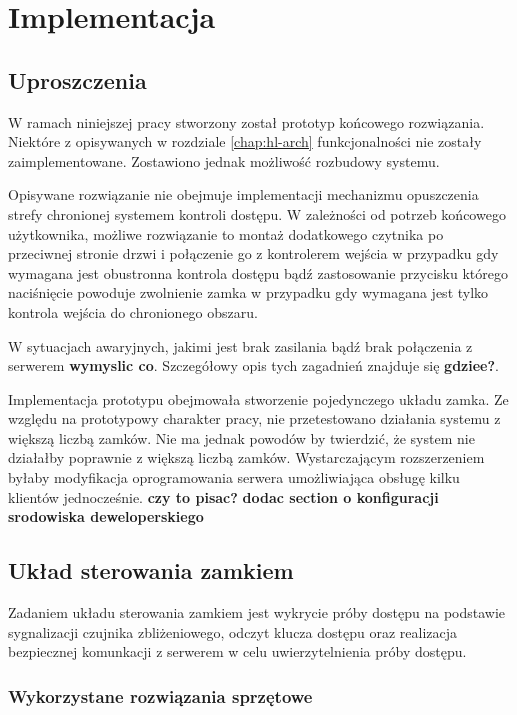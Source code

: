 \chapter{Implementacja}
\label{chap:implementation}

\section{Uproszczenia}

    W ramach niniejszej pracy stworzony został prototyp końcowego rozwiązania. Niektóre z opisywanych w rozdziale \ref{chap:hl-arch} funkcjonalności nie zostały zaimplementowane. Zostawiono jednak możliwość rozbudowy systemu.

    Opisywane rozwiązanie nie obejmuje implementacji mechanizmu opuszczenia strefy chronionej systemem kontroli dostępu. W zależności od potrzeb końcowego użytkownika, możliwe rozwiązanie to montaż dodatkowego czytnika po przeciwnej stronie drzwi i połączenie go z kontrolerem wejścia w przypadku gdy wymagana jest obustronna kontrola dostępu bądź zastosowanie przycisku którego naciśnięcie powoduje zwolnienie zamka w przypadku gdy wymagana jest tylko kontrola wejścia do chronionego obszaru.

    W sytuacjach awaryjnych, jakimi jest brak zasilania bądź brak połączenia z serwerem \textbf{wymyslic co}. Szczegółowy opis tych zagadnień znajduje się \textbf{gdziee?}.

    Implementacja prototypu obejmowała stworzenie pojedynczego układu zamka. Ze względu na prototypowy charakter pracy, nie przetestowano działania systemu z większą liczbą zamków. Nie ma jednak powodów by twierdzić, że system nie działałby poprawnie z większą liczbą zamków. Wystarczającym rozszerzeniem byłaby modyfikacja oprogramowania serwera umożliwiająca obsługę kilku klientów jednocześnie. \textbf{czy to pisac?}
\textbf{dodac section o  konfiguracji srodowiska deweloperskiego}

\section{Układ sterowania zamkiem}

    Zadaniem układu sterowania zamkiem jest wykrycie próby dostępu na podstawie sygnalizacji czujnika zbliżeniowego, odczyt klucza dostępu oraz realizacja bezpiecznej komunkacji z serwerem w celu uwierzytelnienia próby dostępu.

    \subsection{Wykorzystane rozwiązania sprzętowe}

